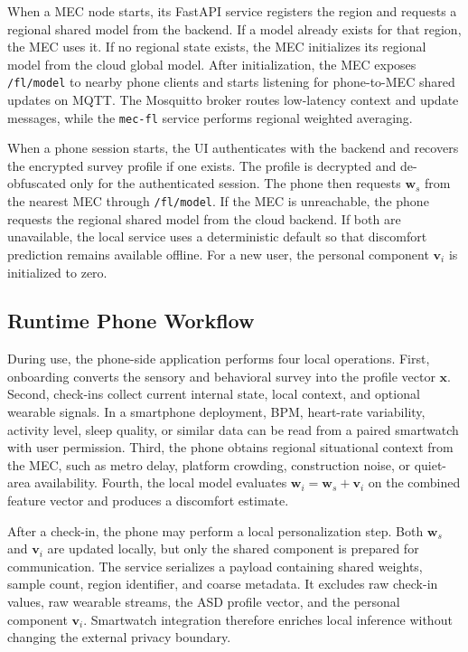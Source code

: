 \documentclass[lettersize,journal]{IEEEtran}
\begin{document}
When a MEC node starts, its FastAPI service registers the region and
requests a regional shared model from the backend. If a model already
exists for that region, the MEC uses it. If no regional state exists,
the MEC initializes its regional model from the cloud global model.
After initialization, the MEC exposes \texttt{/fl/model} to nearby phone
clients and starts listening for phone-to-MEC shared updates on MQTT.
The Mosquitto broker routes low-latency context and update messages,
while the \texttt{mec-fl} service performs regional weighted averaging.

When a phone session starts, the UI authenticates with the backend and
recovers the encrypted survey profile if one exists. The profile is
decrypted and de-obfuscated only for the authenticated session. The
phone then requests $\mathbf{w}_s$ from the nearest MEC through
\texttt{/fl/model}. If the MEC is unreachable, the phone requests the
regional shared model from the cloud backend. If both are unavailable,
the local service uses a deterministic default so that discomfort
prediction remains available offline. For a new user, the personal
component $\mathbf{v}_i$ is initialized to zero.

\subsection{Runtime Phone Workflow}

During use, the phone-side application performs four local operations.
First, onboarding converts the sensory and behavioral survey into the
profile vector $\mathbf{x}$. Second, check-ins collect current internal
state, local context, and optional wearable signals. In a smartphone
deployment, BPM, heart-rate variability, activity level, sleep quality,
or similar data can be read from a paired smartwatch with user
permission. Third, the phone obtains regional situational context from
the MEC, such as metro delay, platform crowding, construction noise, or
quiet-area availability. Fourth, the local model evaluates
$\mathbf{w}_i=\mathbf{w}_s+\mathbf{v}_i$ on the combined feature vector
and produces a discomfort estimate.

After a check-in, the phone may perform a local personalization step.
Both $\mathbf{w}_s$ and $\mathbf{v}_i$ are updated locally, but only the
shared component is prepared for communication. The service serializes a
payload containing shared weights, sample count, region identifier, and
coarse metadata. It excludes raw check-in values, raw wearable streams,
the ASD profile vector, and the personal component $\mathbf{v}_i$.
Smartwatch integration therefore enriches local inference without
changing the external privacy boundary.
\end{document}
